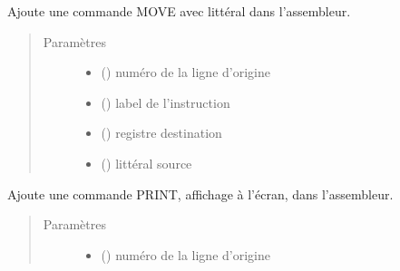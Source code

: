 \documentclass[letterpaper,10pt,french]{sphinxmanual}
\begin{document}
\begin{fulllineitems}
\begin{fulllineitems}
\label{\detokenize{assembleurcontainer:assembleurcontainer.AssembleurContainer.pushMoveLitteral}}
Ajoute une commande MOVE avec littéral dans l’assembleur.
\begin{quote}\begin{description}
\item[{Paramètres}] \leavevmode\begin{itemize}
\item {} 
 () \textendash{} numéro de la ligne d’origine

\item {} 
 (\sphinxstyleliteralemphasis{\sphinxupquote{{[}}}{\hyperref[\detokenize{label:label.Label}]{\sphinxcrossref{\sphinxstyleliteralemphasis{\sphinxupquote{Label}}}}}\sphinxstyleliteralemphasis{\sphinxupquote{{]}}}) \textendash{} label de l’instruction

\item {} 
 () \textendash{} registre destination

\item {} 
 ({\hyperref[\detokenize{litteral:litteral.Litteral}]{}}) \textendash{} littéral source

\end{itemize}

\end{description}\end{quote}

\end{fulllineitems}


\begin{fulllineitems}
\label{\detokenize{assembleurcontainer:assembleurcontainer.AssembleurContainer.pushPrint}}
Ajoute une commande PRINT, affichage à l’écran, dans l’assembleur.
\begin{quote}\begin{description}
\item[{Paramètres}] \leavevmode\begin{itemize}
\item {} 
 () \textendash{} numéro de la ligne d’origine


\end{itemize}
\end{description}
\end{quote}
\end{fulllineitems}
\end{fulllineitems}
\end{document}

